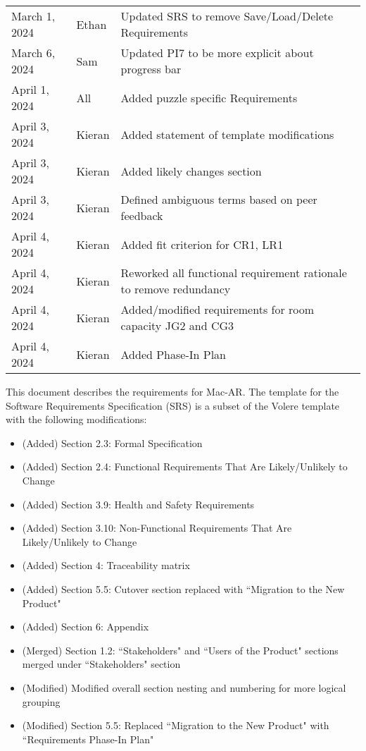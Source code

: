 \documentclass[12pt]{article}
\begin{document}
\begin{table}[hp]
\begin{tabularx}{\textwidth}{llX}
            March 1, 2024 & Ethan & Updated SRS to remove Save/Load/Delete Requirements\\
            March 6, 2024 & Sam & Updated PI7 to be more explicit about progress bar\\
            April 1, 2024 & All & Added puzzle specific Requirements\\
            April 3, 2024 & Kieran & Added statement of template modifications\\
            April 3, 2024 & Kieran & Added likely changes section\\
            April 3, 2024 & Kieran & Defined ambiguous terms based on peer feedback\\
            April 4, 2024 & Kieran & Added fit criterion for CR1, LR1\\
            April 4, 2024 & Kieran & Reworked all functional requirement rationale to remove redundancy\\
            April 4, 2024 & Kieran & Added/modified requirements for room capacity JG2 and CG3\\
            April 4, 2024 & Kieran & Added Phase-In Plan\\
		\bottomrule
	\end{tabularx}
\end{table}

\newpage


This document describes the requirements for Mac-AR. The template for the Software Requirements
Specification (SRS) is a subset of the Volere template~\citep{RobertsonAndRobertson2012} with the following modifications:
\begin{itemize}
    \item (Added) Section 2.3: Formal Specification
    \item (Added) Section 2.4: Functional Requirements That Are Likely/Unlikely to Change
    \item (Added) Section 3.9: Health and Safety Requirements
    \item (Added) Section 3.10: Non-Functional Requirements That Are Likely/Unlikely to Change
    \item (Added) Section 4: Traceability matrix
    \item (Added) Section 5.5: Cutover section replaced with ``Migration to the New Product"
    \item (Added) Section 6: Appendix
    \item (Merged) Section 1.2: ``Stakeholders" and ``Users of the Product" sections merged under ``Stakeholders" section
    \item (Modified) Modified overall section nesting and numbering for more logical grouping
    \item (Modified) Section 5.5: Replaced ``Migration to the New Product" with ``Requirements Phase-In Plan"
\end{itemize}
\end{document}
